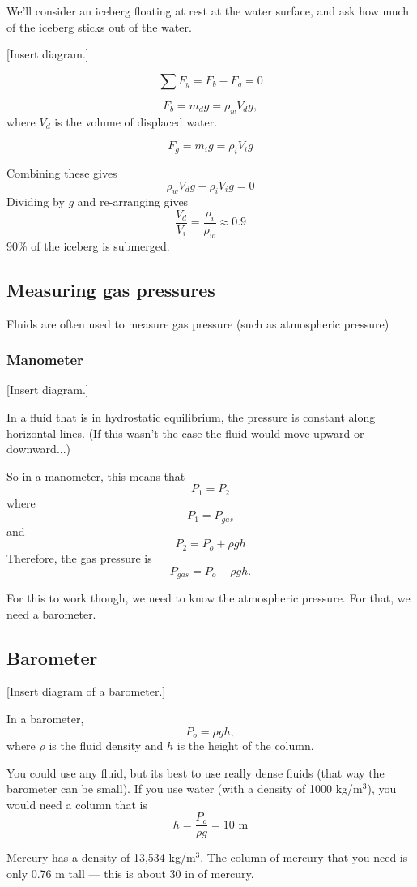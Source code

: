 We'll consider an iceberg floating at rest at the water surface, and ask how much of the iceberg sticks out of the water.

[Insert diagram.]
\vspace{5cm}

$$\sum F_y=F_b-F_g=0$$

$$F_b=m_dg=\rho_wV_dg,$$
where $V_d$ is the volume of displaced water.

$$F_g=m_ig=\rho_iV_ig$$

Combining these gives
$$\rho_wV_dg-\rho_iV_ig=0$$
Dividing by $g$ and re-arranging gives
$$\frac{V_d}{V_i}=\frac{\rho_i}{\rho_w}\approx 0.9$$
90\% of the iceberg is submerged.


\subsection{Measuring gas pressures}
Fluids are often used to measure gas pressure (such as atmospheric pressure)

\subsubsection{Manometer}
[Insert diagram.]
\vspace{5cm}

In a fluid that is in hydrostatic equilibrium, the pressure is constant along horizontal lines. (If this wasn't the case the fluid would move upward or downward...)

So in a manometer, this means that 
$$P_1=P_2$$
where
$$P_1=P_{gas}$$
and
$$P_2=P_o+\rho gh$$
Therefore, the gas pressure is
$$P_{gas}=P_o+\rho gh.$$

For this to work though, we need to know the atmospheric pressure. For that, we need a barometer.

\subsection{Barometer}
[Insert diagram of a barometer.]
\vspace{5cm}

In a barometer, 
$$P_o=\rho gh,$$
where $\rho$ is the fluid density and $h$ is the height of the column.

You could use any fluid, but its best to use really dense fluids (that way the barometer can be small). If you use water (with a density of 1000 kg/m$^3$), you would need a column that is
$$h=\frac{P_o}{\rho g}=10\mbox{ m}$$

Mercury has a density of 13,534 kg/m$^3$. The column of mercury that you need is only 0.76 m tall --- this is about 30 in of mercury.


 


\clearpage


